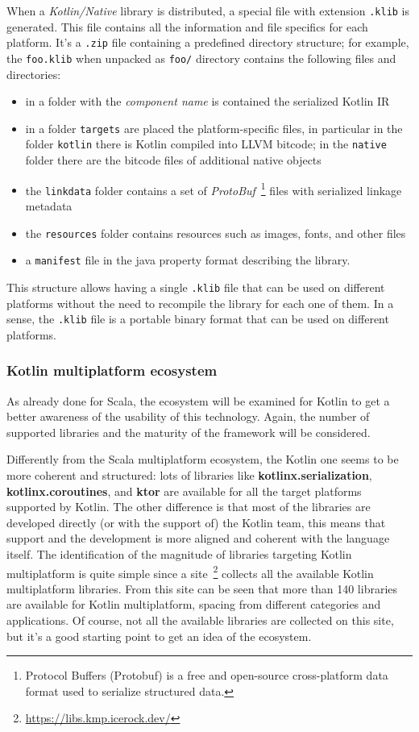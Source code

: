 When a \emph{Kotlin/Native} library is distributed, a special file with extension \texttt{.klib} is generated. This file contains all the information and file specifics for each platform. It's a \texttt{.zip} file containing a predefined directory structure; for example,
the \texttt{foo.klib} when unpacked as \texttt{foo/} directory contains the following files and directories:
\begin{itemize}
	\item in a folder with the \emph{component name} is contained the serialized Kotlin IR
	\item in a folder \texttt{targets} are placed the platform-specific files, in particular in the folder \texttt{kotlin} there is Kotlin compiled
	      into LLVM bitcode; in the \texttt{native} folder there are the bitcode files of additional native objects
	\item the \texttt{linkdata} folder contains a set of \emph{ProtoBuf}~\footnote{Protocol Buffers (Protobuf) is a free and open-source
		      cross-platform data format used to serialize structured data.} files with serialized linkage metadata
	\item the \texttt{resources} folder contains resources such as images, fonts, and other files
	\item a \texttt{manifest} file in the java property format describing the library.
\end{itemize}

This structure allows having a single \texttt{.klib} file that can be used on different platforms without the need to recompile the library for each
one of them. In a sense, the \texttt{.klib} file is a portable binary format that can be used on different platforms.

\subsubsection*{Kotlin multiplatform ecosystem}

As already done for Scala, the ecosystem will be examined for Kotlin to get a better awareness of the usability of this technology.
Again, the number of supported libraries and the maturity of the framework will be considered.

Differently from the Scala multiplatform ecosystem, the Kotlin one seems to be more coherent and structured: lots of libraries
like \textbf{kotlinx.serialization}, \textbf{kotlinx.coroutines}, and \textbf{ktor} are available for all the target platforms supported by Kotlin.
The other difference is that most of the libraries are developed directly (or with the support of) the Kotlin team, this means that support and the
development is more aligned and coherent with the language itself.
The identification of the magnitude of libraries targeting Kotlin multiplatform is quite simple since a
site~\footnote{\url{https://libs.kmp.icerock.dev/}} collects all the available Kotlin multiplatform libraries. From this site can be seen that more
than 140 libraries are available for Kotlin multiplatform, spacing from different categories and applications. Of course, not all the available
libraries are collected on this site, but it's a good starting point to get an idea of the ecosystem.

